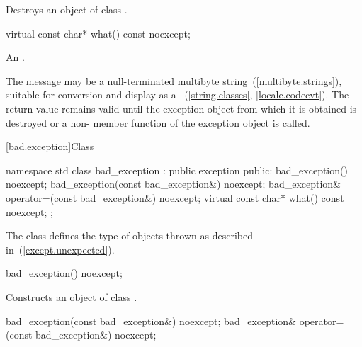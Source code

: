 \begin{itemdescr}
\pnum
\effects
Destroys an object of class
.
\end{itemdescr}

%
\begin{itemdecl}
virtual const char* what() const noexcept;
\end{itemdecl}

\begin{itemdescr}
\pnum
\returns
{}%
An  \ntbs.

\pnum
\remarks
The message may be a null-terminated multibyte string~(\ref{multibyte.strings}),
suitable for conversion and display as a
~(\ref{string.classes}, \ref{locale.codecvt}).
The return value remains valid until the exception object from which
it is obtained is destroyed or a non-
member function of the exception object is called.
\end{itemdescr}

[bad.exception]{Class }

%
\begin{codeblock}
namespace std {
  class bad_exception : public exception {
  public:
    bad_exception() noexcept;
    bad_exception(const bad_exception&) noexcept;
    bad_exception& operator=(const bad_exception&) noexcept;
    virtual const char* what() const noexcept;
  };
}
\end{codeblock}

\pnum
The class
defines the type of objects thrown as
described in~(\ref{except.unexpected}).

%
\begin{itemdecl}
bad_exception() noexcept;
\end{itemdecl}

\begin{itemdescr}
\pnum
\effects
Constructs an object of class
.
\end{itemdescr}

%
%
\begin{itemdecl}
bad_exception(const bad_exception&) noexcept;
bad_exception& operator=(const bad_exception&) noexcept;
\end{itemdecl}

